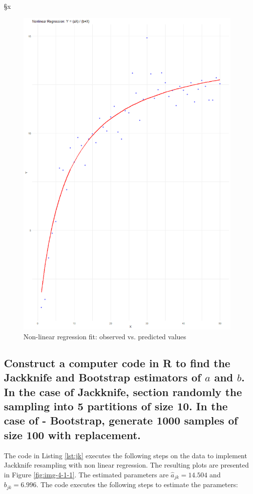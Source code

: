 §x\documentclass[]{article}
\begin{document}
\begin{figure}[H]
	\centering
	\includegraphics[width=0.7\linewidth]{img/img-4-1}
	\caption{Non-linear regression fit: observed vs. predicted values}
	\label{fig:img-4-1}
\end{figure}


\subsection{Construct a computer code in R to find the Jackknife and Bootstrap estimators of $a$ and $b$. In the case of Jackknife, section randomly the sampling into 5 partitions of size 10. In the case of -
	Bootstrap, generate 1000 samples of size 100 with replacement. }



The code in Listing \ref{lst:jk} executes the following steps on the data to implement Jackknife resampling with non linear regression. The resulting plots are presented in Figure \ref{fig:img-4-1-1}. The estimated parameters are $\hat{a}_{jk} = 14.504$ and $\hat{b}_{jk} = 6.996$. The code executes the following steps to estimate the parameters:
\end{document}
